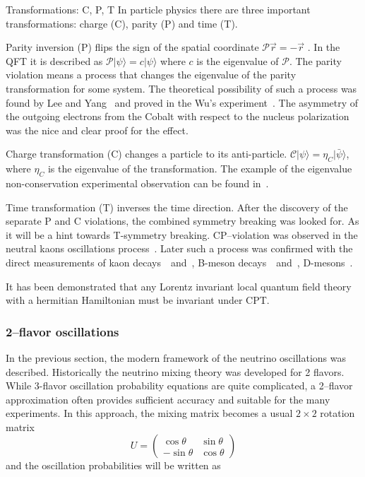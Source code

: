 \documentclass[../main.tex]{subfiles}
\begin{document}
\begin{bclogo}[couleur=blue!2, arrondi=0.1, logo=\bcinfo, nobreak=true]{Transformations: C, P, T}
In particle physics there are three important transformations: charge (C), parity (P) and time (T).

Parity inversion (P) flips the sign of the spatial coordinate $\mathcal{P}\overrightarrow{r}=-\overrightarrow{r}$ . In the QFT it is described as $\mathcal{P}\lvert\psi\rangle=c\lvert\psi\rangle$ where $c$ is the eigenvalue of $\mathcal{P}$. The parity violation means a process that changes the eigenvalue of the parity transformation for some system. The theoretical possibility of such a process was found by Lee and Yang~\cite{Lee1956} and proved in the Wu's experiment~\cite{Wu1957}. The asymmetry of the outgoing electrons from the Cobalt with respect to the nucleus polarization was the nice and clear proof for the effect.

Charge transformation (C) changes a particle to its anti-particle. $\mathcal{C}\lvert\psi\rangle=\eta_{C}\lvert\bar{\psi}\rangle$, where $\eta_{C}$ is the eigenvalue of the transformation. The example of the eigenvalue non-conservation experimental observation can be found in~\cite{Gormley1968}.

Time transformation (T) inverses the time direction. After the discovery of the separate P and C violations, the combined symmetry breaking was looked for. As it will be a hint towards T-symmetry breaking. CP--violation was observed in the neutral kaons oscillations process~\cite{Christenson1964}. Later such a process was confirmed with the direct measurements of kaon decays~\cite{Alavi-Harati1999}~and~\cite{Fanti1999}, B-meson decays~\cite{Aubert2001}~and~\cite{Abe2001}, D-mesons~\cite{Aaij2019}.

It has been demonstrated that any Lorentz invariant local quantum field theory with a hermitian Hamiltonian must be invariant under CPT.
\end{bclogo}

\subsubsection{2--flavor oscillations}
In the previous section, the modern framework of the neutrino oscillations was described. Historically the neutrino mixing theory was developed for 2 flavors. While 3-flavor oscillation probability equations are quite complicated, a 2--flavor approximation often provides sufficient accuracy and suitable for the many experiments. In this approach, the mixing matrix becomes a usual $2\times2$ rotation matrix
\begin{equation}
U=
\begin{pmatrix}
\cos\theta    & \sin\theta     \\
-\sin\theta   & \cos\theta
\end{pmatrix}
\end{equation}
and the oscillation probabilities will be written as
\end{document}
